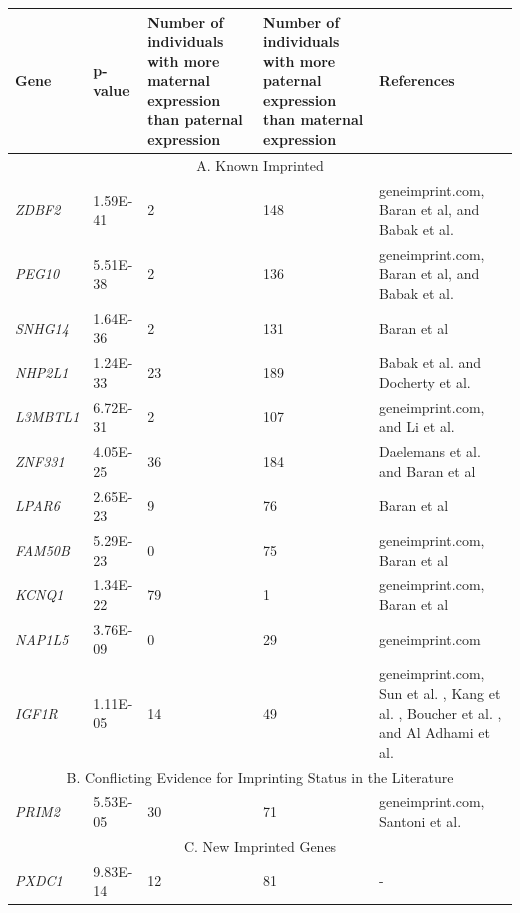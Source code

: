 \begin{table}
\centering
\begin{adjustbox}{width={\textwidth}}
\begin{tabular}{@{}p{3cm}|p{2cm}p{5cm}p{5cm}p{6cm}@{}}
\toprule Gene & p-value & Number of individuals with more maternal expression than paternal expression & Number of individuals with more paternal expression than maternal expression & References \\ \midrule
 \multicolumn{5}{c}{A. Known Imprinted}  \\ \midrule
 \emph{ZDBF2} & 1.59E-41 & 2 & 148 & geneimprint.com, Baran et al\citep{Baran:2015cx}, and Babak et al.\citep{Babak2015} \\
 \emph{PEG10} & 5.51E-38 & 2 & 136 & geneimprint.com, Baran et al\citep{Baran:2015cx}, and Babak et al.\citep{Babak2015} \\
 \emph{SNHG14} & 1.64E-36 & 2 & 131 & Baran et al\citep{Baran:2015cx} \\
 \emph{NHP2L1} & 1.24E-33 & 23 & 189 & Babak et al.\citep{Babak2015}  and Docherty et al. \citep{Docherty:2014cx} \\
 \emph{L3MBTL1} & 6.72E-31 & 2 & 107 & geneimprint.com, and Li et al. \citep{Li:2004km}\\
 \emph{ZNF331} & 4.05E-25 & 36 & 184 & Daelemans et al.\citep{Daelemans:2010kc} and Baran et al\citep{Baran:2015cx} \\
 \emph{LPAR6} & 2.65E-23 & 9 & 76 & Baran et al\citep{Baran:2015cx}\\
 \emph{FAM50B} & 5.29E-23 & 0 & 75 & geneimprint.com, Baran et al\citep{Baran:2015cx}\\
 \emph{KCNQ1} & 1.34E-22 & 79 & 1 & geneimprint.com, Baran et al\citep{Baran:2015cx} \\
 \emph{NAP1L5} & 3.76E-09 & 0 & 29 & geneimprint.com \\
 \emph{IGF1R} & 1.11E-05 & 14 & 49 & geneimprint.com, Sun et al. \citep{Sun:2014eq}, Kang et al. \citep{Kang:2015ko}, Boucher et al. \citep{Boucher:2014gk}, and Al Adhami et al.\citep{AlAdhami:2015dx}\\ \midrule
 \multicolumn{5}{c}{B. Conflicting Evidence for Imprinting Status in the Literature}  \\ \midrule
\emph{PRIM2} & 5.53E-05 & 30 & 71 & geneimprint.com, Santoni et al. \citep{Santoni:2017hu}\\ \midrule
\multicolumn{5}{c}{C. New Imprinted Genes}  \\ \midrule
 \emph{PXDC1} & 9.83E-14 & 12 & 81 & - \\

\end{tabular}
\end{adjustbox}
\end{table}
